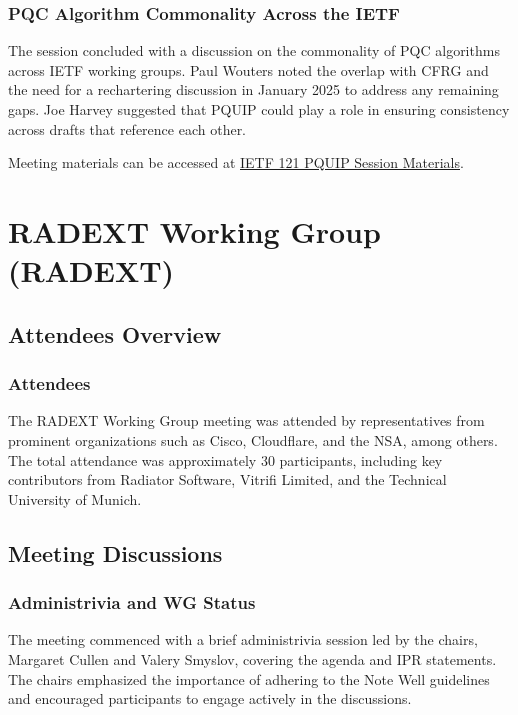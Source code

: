 \documentclass{article}
\begin{document}
\subsubsection{PQC Algorithm Commonality Across the IETF}
The session concluded with a discussion on the commonality of PQC algorithms across IETF working groups. Paul Wouters noted the overlap with CFRG and the need for a rechartering discussion in January 2025 to address any remaining gaps. Joe Harvey suggested that PQUIP could play a role in ensuring consistency across drafts that reference each other.

Meeting materials can be accessed at \href{https://datatracker.ietf.org/meeting/121/session/pquip}{IETF 121 PQUIP Session Materials}.



\newpage

\section{RADEXT Working Group (RADEXT)}

\subsection{Attendees Overview}

\subsubsection{Attendees}

The RADEXT Working Group meeting was attended by representatives from prominent organizations such as Cisco, Cloudflare, and the NSA, among others. The total attendance was approximately 30 participants, including key contributors from Radiator Software, Vitrifi Limited, and the Technical University of Munich.

\subsection{Meeting Discussions}

\subsubsection{Administrivia and WG Status}

The meeting commenced with a brief administrivia session led by the chairs, Margaret Cullen and Valery Smyslov, covering the agenda and IPR statements. The chairs emphasized the importance of adhering to the Note Well guidelines and encouraged participants to engage actively in the discussions.
\end{document}
